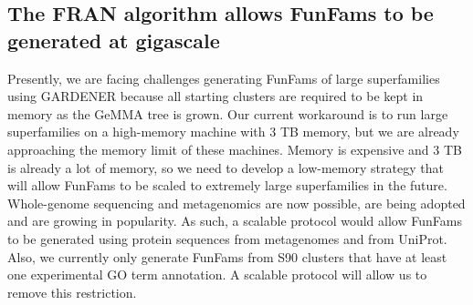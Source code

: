 %
%

\subsection{The FRAN algorithm allows FunFams to be generated at gigascale}

Presently, we are facing challenges generating FunFams of large superfamilies using GARDENER because all starting clusters are required to be kept in memory as the GeMMA tree is grown. Our current workaround is to run large superfamilies on a high-memory machine with $3$ TB memory, but we are already approaching the memory limit of these machines. Memory is expensive and 3 TB is already a lot of memory, so we need to develop a low-memory strategy that will allow FunFams to be scaled to extremely large superfamilies in the future. Whole-genome sequencing and metagenomics are now possible, are being adopted and are growing in popularity. As such, a scalable protocol would allow FunFams to be generated using protein sequences from metagenomes and from UniProt. Also, we currently only generate FunFams from S90 clusters that have at least one experimental GO term annotation. A scalable protocol will allow us to remove this restriction.

